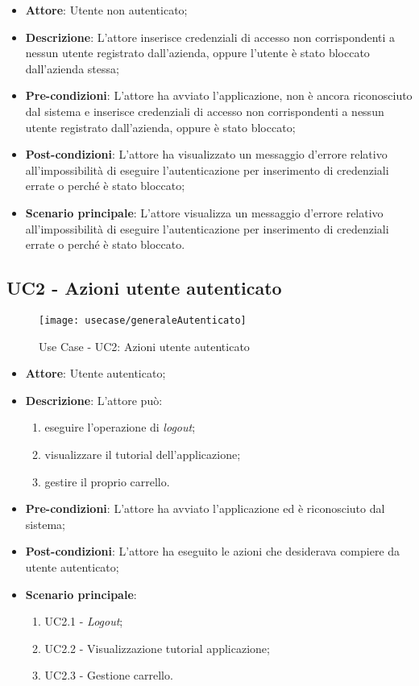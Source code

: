 \begin{itemize}
	\item \textbf{Attore}: Utente non autenticato;
	\item \textbf{Descrizione}: L'attore inserisce credenziali di accesso non corrispondenti a nessun utente registrato dall'azienda, oppure l'utente è stato bloccato dall'azienda stessa;
	\item \textbf{Pre-condizioni}: L'attore ha avviato l'applicazione, non è ancora riconosciuto dal sistema e inserisce credenziali di accesso non corrispondenti a nessun utente registrato dall'azienda, oppure è stato bloccato;
	\item \textbf{Post-condizioni}: L'attore ha visualizzato un messaggio d'errore relativo all'impossibilità di eseguire l'autenticazione per inserimento di credenziali errate o perché è stato bloccato;
	\item \textbf{Scenario principale}: L'attore visualizza un messaggio d'errore relativo all'impossibilità di eseguire l'autenticazione per inserimento di credenziali errate o perché è stato bloccato.
\end{itemize}

\newpage

\subsection{UC2 - Azioni utente autenticato}

\begin{figure}[!h] 
    \centering 
    \texttt{[image: usecase/generaleAutenticato]} 
    \caption{Use Case - UC2: Azioni utente autenticato}
\end{figure}

\begin{itemize}
	\item \textbf{Attore}: Utente autenticato;
	\item \textbf{Descrizione}: L'attore può:
	\begin{enumerate}
		\item eseguire l'operazione di \textit{logout};
		\item visualizzare il tutorial dell'applicazione;
		\item gestire il proprio carrello. 
	\end{enumerate}
	\item \textbf{Pre-condizioni}: L'attore ha avviato l'applicazione ed è riconosciuto dal sistema;
	\item \textbf{Post-condizioni}: L'attore ha eseguito le azioni che desiderava compiere da utente autenticato;
	\item \textbf{Scenario principale}: 
		\begin{enumerate}
			\item UC2.1 - \textit{Logout};
			\item UC2.2 - Visualizzazione tutorial applicazione;
			\item UC2.3 - Gestione carrello.
		\end{enumerate}
\end{itemize}

